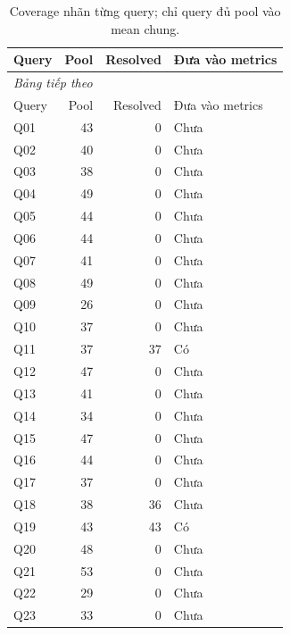 \begingroup\small\setlength{\tabcolsep}{4pt}\renewcommand{\arraystretch}{1.16}
\begin{longtable}{lrrl}
\caption{Coverage nhãn từng query; chỉ query đủ pool vào mean chung.}\label{tab:coverage}\\
\toprule Query & Pool & Resolved & Đưa vào metrics \\
\midrule\endfirsthead
\multicolumn{4}{l}{\textit{Bảng tiếp theo}}\\
\toprule Query & Pool & Resolved & Đưa vào metrics \\
\midrule\endhead
\bottomrule\endfoot
Q01 & 43 & 0 & Chưa \\
Q02 & 40 & 0 & Chưa \\
Q03 & 38 & 0 & Chưa \\
Q04 & 49 & 0 & Chưa \\
Q05 & 44 & 0 & Chưa \\
Q06 & 44 & 0 & Chưa \\
Q07 & 41 & 0 & Chưa \\
Q08 & 49 & 0 & Chưa \\
Q09 & 26 & 0 & Chưa \\
Q10 & 37 & 0 & Chưa \\
Q11 & 37 & 37 & Có \\
Q12 & 47 & 0 & Chưa \\
Q13 & 41 & 0 & Chưa \\
Q14 & 34 & 0 & Chưa \\
Q15 & 47 & 0 & Chưa \\
Q16 & 44 & 0 & Chưa \\
Q17 & 37 & 0 & Chưa \\
Q18 & 38 & 36 & Chưa \\
Q19 & 43 & 43 & Có \\
Q20 & 48 & 0 & Chưa \\
Q21 & 53 & 0 & Chưa \\
Q22 & 29 & 0 & Chưa \\
Q23 & 33 & 0 & Chưa \\
\end{longtable}\endgroup
{}
